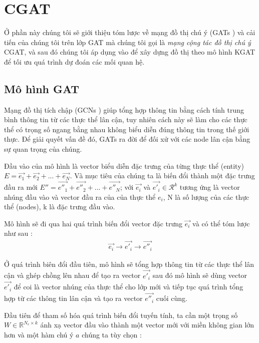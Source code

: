 \section{CGAT}

Ở phần này chúng tôi sẽ giới thiệu tóm lược về mạng đồ thị chú ý (GATs \cite{velivckovic2017graph}) và cải tiến của chúng tôi trên lớp GAT mà chúng tôi gọi là \textit{mạng cộng tác đồ thị chú ý} CGAT, và sau đó chúng tôi áp dụng vào để xây dựng đồ thị theo mô hình KGAT \cite{nathani2019learning} để tối ưu quá trình dự đoán các mối quan hệ. 

\subsection{Mô hình GAT}

Mạng đồ thị tích chập (GCNs \cite{schlichtkrull2018modeling}) giúp tổng hợp thông tin bằng cách tính trung bình thông tin từ các thực thể lân cận, tuy nhiên cách này sẽ làm cho các thực thể có trọng số ngang bằng nhau không biểu diễn đúng thông tin trong thế giới thực. Để giải quyết vấn đề đó, GATs \cite{velivckovic2017graph} ra đời để đối xử với các node lân cận bằng sự quan trọng của chúng.

Đầu vào của mô hình là vector biểu diễn đặc trưng của từng thực thể (entity) $E = \overrightarrow{e_1} + \overrightarrow{e_2} + ... + \overrightarrow{e_N}$. Và mục tiêu của chúng ta là biến đổi thành một đặc trưng đầu ra mới $E'' = \overrightarrow{e''_1} + \overrightarrow{e''_2} + ... + \overrightarrow{e''_N}$; với $\overrightarrow{e_i}$ và $\overrightarrow{e'_i} \in \mathcal{R}^k$ tương ứng là vector nhúng đầu vào và vector đầu ra của của thực thể $e_i$, N là số lượng của các thực thể (nodes), k là đặc trưng đầu vào.

Mô hình sẽ đi qua hai quá trình biến đổi vector đặc trưng $\overrightarrow{e_i}$ và có thể tóm lược như sau :
\begin{align}
\overrightarrow{e_i} \longrightarrow \overrightarrow{e'_i} \longrightarrow \overrightarrow{e''_i}
\end{align}

Ở quá trình biên đổi đầu tiên, mô hình sẽ tổng hợp thông tin từ các thực thể lân cận và ghép chồng lên nhau để tạo ra vector $\overrightarrow{e'_i}$ sau đó mô hình sẽ dùng vector $\overrightarrow{e'_i}$ để coi là vector nhúng của thực thể cho lớp mới và tiếp tục quá trình tổng hợp từ các thông tin lân cận và tạo ra vector $\overrightarrow{e''_i}$ cuối cùng.

Đầu tiên để tham số hóa quá trình biến đổi tuyến tính, ta cần một trọng số $W \in \mathbb{R}^{N_e \times k}$ ánh xạ vector đầu vào thành một vector mới với miền không gian lớn hơn và một hàm chú ý $a$ chúng ta tùy chọn :

